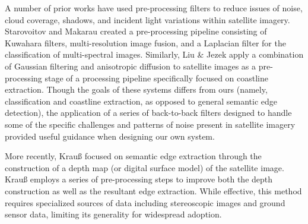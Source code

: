 \documentclass[conference]{IEEEtran}
\begin{document}
A number of prior works have used pre-processing filters to reduce issues of noise, cloud coverage, shadows, and incident light variations within satellite imagery. Starovoitov and Makarau \cite{StarovoitovMakarau2008} created a pre-processing pipeline consisting of Kuwahara filters, multi-resolution image fusion, and a Laplacian filter for the classification of multi-spectral images. Similarly, Liu \& Jezek \cite{LiuJezek2004} apply a combination of Gaussian filtering and anisotropic diffusion to satellite images as a pre-processing stage of a processing pipeline specifically focused on coastline extraction. Though the goals of these systems differs from ours (namely, classification and coastline extraction, as opposed to general semantic edge detection), the application of a series of back-to-back filters designed to handle some of the specific challenges and patterns of noise present in satellite imagery provided useful guidance when designing our own system. 

More recently, Krauß \cite{Krauss2015} focused on semantic edge extraction through the construction of a depth map (or digital surface model) of the satellite image. Krauß employs a series of pre-processing steps to improve both the depth construction as well as the resultant edge extraction. While effective, this method requires specialized sources of data including stereoscopic images and ground sensor data, limiting its generality for widespread adoption.

\end{document}
